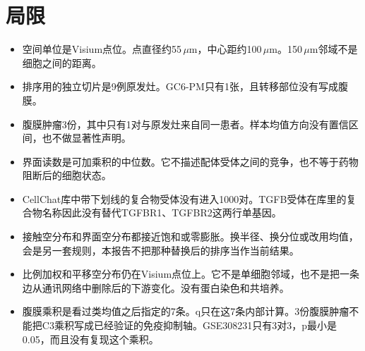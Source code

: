 \section{局限}
\label{sec:limitations}

\begin{itemize}
  \item 空间单位是Visium点位。点直径约55\,$\mu$m，中心距约100\,$\mu$m。150\,$\mu$m邻域不是细胞之间的距离。
  \item 排序用的独立切片是9例原发灶。GC6-PM只有1张，且转移部位没有写成腹膜。
  \item 腹膜肿瘤3份，其中只有1对与原发灶来自同一患者。样本均值方向没有置信区间，也不做显著性声明。
  \item 界面读数是可加乘积的中位数。它不描述配体受体之间的竞争，也不等于药物阻断后的细胞状态。
  \item CellChat库中带下划线的复合物受体没有进入1000对。TGFB受体在库里的复合物名称因此没有替代TGFBR1、TGFBR2这两行单基因。
  \item 接触空分布和界面空分布都接近饱和或零膨胀。换半径、换分位或改用均值，会是另一套规则，本报告不把那种替换后的排序当作当前结果。
  \item 比例加权和平移空分布仍在Visium点位上。它不是单细胞邻域，也不是把一条边从通讯网络中删除后的下游变化。没有蛋白染色和共培养。
  \item 腹膜乘积是看过类均值之后指定的7条。q只在这7条内部计算。3份腹膜肿瘤不能把C3乘积写成已经验证的免疫抑制轴。GSE308231只有3对3，p最小是0.05，而且没有复现这个乘积。
\end{itemize}
